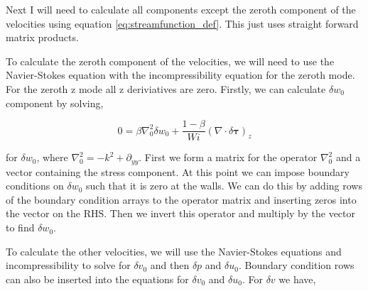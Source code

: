 \documentclass[12pt,a4paper]{article}
\newcommand{\su}{\delta u}
\newcommand{\sv}{\delta v}
\newcommand{\sw}{\delta w}
\newcommand{\spr}{\delta p}
\newcommand{\dd}[1]{\partial_{#1}}
\begin{document}
Next I will need to calculate all components except the zeroth component of the velocities using equation \ref{eq:streamfunction_def}. This just uses straight forward matrix products.

To calculate the zeroth component of the velocities, we will need to use the Navier-Stokes equation with the incompressibility equation for the zeroth mode. For the zeroth z mode all z deriviatives are zero. Firstly, we can calculate $\sw_{0}$ component by solving,

\begin{equation}
    0 = \beta \nabla_{0}^{2} \sw_{0} + \frac{1-\beta}{Wi} \left( \nabla \cdot \delta \mathbf{\tau} \right)_{z}
\end{equation}

for $\sw_{0}$, where $\nabla_{0}^{2} = -k^{2} + \dd{yy}$. First we form a matrix for the operator $\nabla_{0}^{2}$ and a vector containing the stress component. At this point we can impose boundary conditions on $\sw_{0}$ such that it is zero at the walls. We can do this by adding rows of the boundary condition arrays to the operator matrix and inserting zeros into the vector on the RHS. Then we invert this operator and multiply by the vector to find $\sw_{0}$. 

To calculate the other velocities, we will use the Navier-Stokes equations and incompressibility to solve for $\sv_{0}$ and then $\spr$ and $\su_{0}$. Boundary condition rows can also be inserted into the equations for $\sv_{0}$ and $\su_{0}$. For $\sv$ we have,
\end{document}
